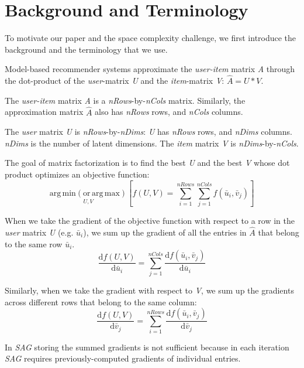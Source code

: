 \section{Background and Terminology}
To motivate our paper and the space complexity challenge, we first introduce the background and the terminology that we use.  


Model-based recommender systems approximate the \emph{user-item} matrix \emph{A} through 
the dot-product of the \emph{user}-matrix \emph{U} and the \emph{item}-matrix \emph{V}: $\hat{A} = U * V.$  

The \emph{user-item} matrix \emph{A} is a \emph{nRows}-by-\emph{nCols} matrix.  
Similarly, the approximation matrix $\hat{A}$ also has \emph{nRows} rows, and \emph{nCols} columns.  

The \emph{user} matrix \emph{U} is \emph{nRows}-by-\emph{nDims}: \emph{U} has \emph{nRows} rows, and \emph{nDims} columns.  
\emph{nDims} is the number of latent dimensions.  
The \emph{item} matrix \emph{V} is \emph{nDims}-by-\emph{nCols}.  


The goal of matrix factorization is to find the best \emph{U} and the best \emph{V} whose dot product optimizes an objective function:
\[ 
\operatorname*{arg\,min (or\,arg\,max)}_{U,V} \left[ f(U, V) = \sum_{i=1}^{nRows} \sum_{j=1}^{nCols} f(\bar{u}_{i}, \bar{v}_{j}) \right]
\]

When we take the gradient of the objective function with respect to a row in the \emph{user} matrix \emph{U} (e.g. $\bar{u}_{i}$), 
we sum up the gradient of all the entries in $\hat{A}$ that belong to the same row $\bar{u}_{i}$.  
\[
\frac{\text{d}f(U,V)}{\text{d}\bar{u}_i} = \sum_{j=1}^{nCols} \frac{\text{d}f(\bar{u}_i,\bar{v}_j)}{\text{d}\bar{u}_i}
\]

Similarly, when we take the gradient with respect to \emph{V}, we sum up the gradients across different rows that belong to the same column: 
\[
\frac{\text{d}f(U,V)}{\text{d}\bar{v}_j} = \sum_{i=1}^{nRows} \frac{\text{d}f(\bar{u}_i,\bar{v}_j)}{\text{d}\bar{v}_j}
\]



In \emph{SAG} storing the summed gradients is not sufficient because in each iteration \emph{SAG} requires previously-computed gradients of individual entries.

